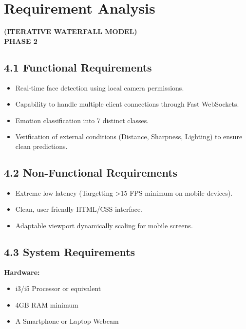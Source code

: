 \documentclass[12pt,a4paper]{report}
\begin{document}
\chapter{Requirement Analysis}
\begin{center}
\textbf{(ITERATIVE WATERFALL MODEL)}\\[6pt]
\textbf{PHASE 2}\\[6pt]
\end{center}

\section*{4.1 Functional Requirements}
\begin{itemize}
    \item Real-time face detection using local camera permissions.
    \item Capability to handle multiple client connections through Fast WebSockets.
    \item Emotion classification into 7 distinct classes.
    \item Verification of external conditions (Distance, Sharpness, Lighting) to ensure clean predictions.
\end{itemize}

\section*{4.2 Non-Functional Requirements}
\begin{itemize}
    \item Extreme low latency (Targetting >15 FPS minimum on mobile devices).
    \item Clean, user-friendly HTML/CSS interface.
    \item Adaptable viewport dynamically scaling for mobile screens.
\end{itemize}

\section*{4.3 System Requirements}

\textbf{Hardware:}
\begin{itemize}
    \item i3/i5 Processor or equivalent
    \item 4GB RAM minimum
    \item A Smartphone or Laptop Webcam
\end{itemize}
\end{document}
